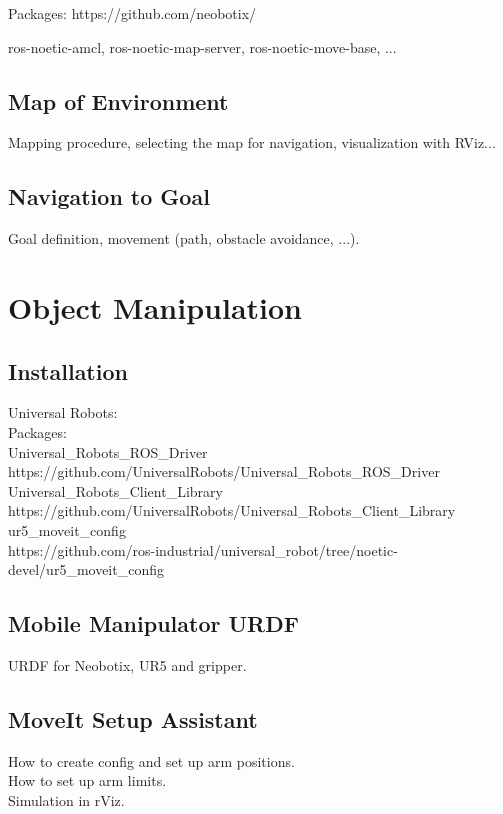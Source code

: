 Packages:
https://github.com/neobotix/

ros-noetic-amcl, ros-noetic-map-server, ros-noetic-move-base, ...

\subsection{Map of Environment}
Mapping procedure, selecting the map for navigation, visualization with RViz...\\

\subsection{Navigation to Goal}
Goal definition, movement (path, obstacle avoidance, ...).

\section{Object Manipulation}


\subsection{Installation}
Universal Robots:\\

Packages:\\
Universal\_Robots\_ROS\_Driver
https://github.com/UniversalRobots/Universal\_Robots\_ROS\_Driver\\

Universal\_Robots\_Client\_Library\\
https://github.com/UniversalRobots/Universal\_Robots\_Client\_Library\\

ur5\_moveit\_config\\
https://github.com/ros-industrial/universal\_robot/tree/noetic-devel/ur5\_moveit\_config\\



\subsection{Mobile Manipulator URDF}
URDF for Neobotix, UR5 and gripper.\\

\subsection{MoveIt Setup Assistant}
How to create config and set up arm positions.\\
How to set up arm limits.\\
Simulation in rViz.\\

